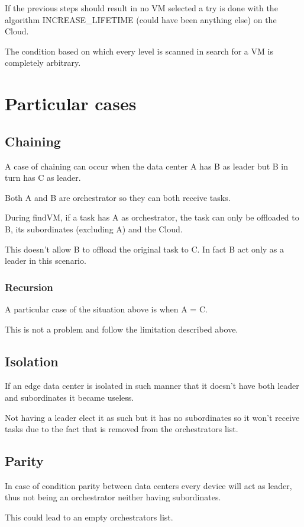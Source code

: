 \documentclass[12pt, a4paper]{report} %
\begin{document}
If the previous steps should result in no VM selected a try is done with the algorithm INCREASE\_LIFETIME (could have been anything else) on the Cloud.

The condition based on which every level is scanned in search for a VM is completely arbitrary.

\section*{Particular cases}

\subsection*{Chaining}
A case of chaining can occur when the data center A has B as leader but B in turn has C as leader.

Both A and B are orchestrator so they can both receive tasks.

During findVM, if a task has A as orchestrator, the task can only be offloaded to B, its subordinates (excluding A) and the Cloud.

This doesn't allow B to offload the original task to C. In fact B act only as a leader in this scenario.
\subsubsection*{Recursion}
A particular case of the situation above is when A = C.

This is not a problem and follow the limitation described above.


\subsection*{Isolation}
If an edge data center is isolated in such manner that it doesn't have both leader and subordinates it became useless.

Not having a leader elect it as such but it has no subordinates so it won't receive tasks due to the fact that is removed from the orchestrators list.

\subsection*{Parity}
In case of condition parity between data centers every device will act as leader, thus not being an orchestrator neither having subordinates.

This could lead to an empty orchestrators list.
\end{document}
